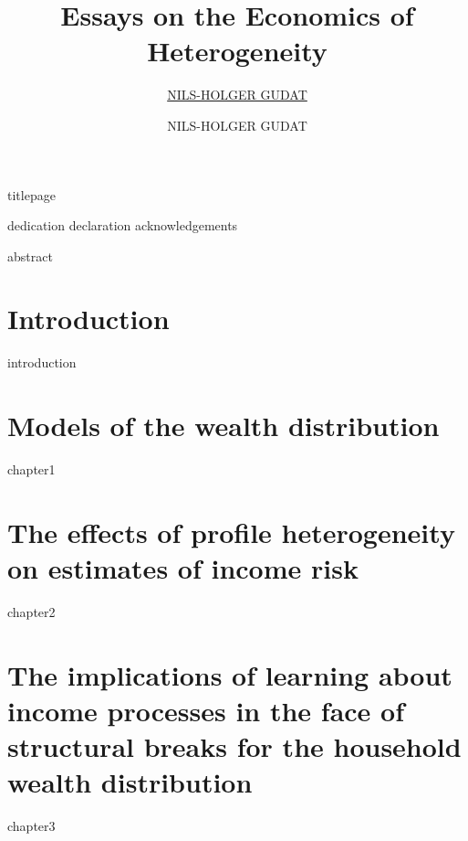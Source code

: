 \documentclass[oneside,12pt,a4paper]{CUEDthesisPSnPDF}
\title{Essays on the Economics of Heterogeneity}
\author{\href{}{NILS-HOLGER GUDAT}}
\author{NILS-HOLGER GUDAT}
\begin{document}
{titlepage}

{dedication}
{declaration}
{acknowledgements}

\begin{abstractslong}
{abstract}
\end{abstractslong}

\setcounter{secnumdepth}{2} %
\setcounter{tocdepth}{1}

\begin{spacing}{1.3}
  \tableofcontents
\end{spacing}

\begin{spacing}{1.5}
	\listoftables
	\listoffigures
\end{spacing}

\chapter{Introduction} %
{introduction}

\chapter{Models of the wealth distribution} %
{chapter1}

\chapter{The effects of profile heterogeneity on estimates of income risk} 
{chapter2}

\chapter{The implications of learning about income processes in the face of structural breaks for the household wealth distribution} 
{chapter3}
\end{document}

